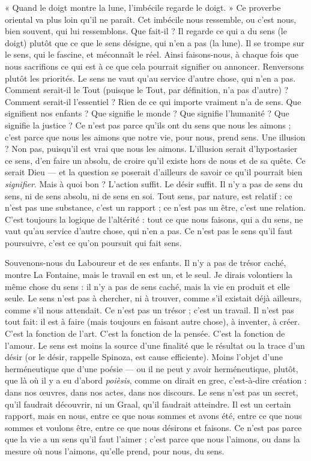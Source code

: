 « Quand le doigt montre la lune, l’imbécile regarde le doigt. » Ce proverbe
oriental va plus loin qu’il ne paraît. Cet imbécile nous ressemble, ou c’est nous,
bien souvent, qui lui ressemblons. Que fait-il ? Il regarde ce qui a du sens (le
doigt) plutôt que ce que le sens désigne, qui n’en a pas (la lune). Il se trompe
sur le sens, qui le fascine, et méconnaît le réel. Ainsi faisons-nous, à chaque fois
que nous sacrifions ce qui est à ce que cela pourrait signifier ou annoncer. Renversons
plutôt les priorités. Le sens ne vaut qu’au service d’autre chose, qui n’en
a pas. Comment serait-il le Tout (puisque le Tout, par définition, n’a pas
d’autre) ? Comment serait-il l’essentiel ? Rien de ce qui importe vraiment n’a
de sens. Que signifient nos enfants ? Que signifie le monde ? Que signifie
l'humanité ? Que signifie la justice ? Ce n’est pas parce qu’ils ont du sens que
nous les aimons ; c’est parce que nous les aimons que notre vie, pour nous,
prend sens. Une illusion ? Non pas, puisqu'il est vrai que nous les aimons.
L’illusion serait d’hypostasier ce sens, d’en faire un absolu, de croire qu’il existe
hors de nous et de sa quête. Ce serait Dieu — et la question se poserait d’ailleurs
de savoir ce qu’il pourrait bien {\it signifier}. Mais à quoi bon ? L'action suffit. Le
désir suffit. Il n’y a pas de sens du sens, ni de sens absolu, ni de sens en soi.
Tout sens, par nature, est relatif : ce n’est pas une substance, c’est un rapport ;
ce n'est pas un être, c’est une relation. C’est toujours la logique de l’altérité :
tout ce que nous faisons, qui a du sens, ne vaut qu’au service d’autre chose, qui
n'en a pas. Ce n’est pas le sens qu’il faut poursuivre, c’est ce qu’on poursuit qui
fait sens.

Souvenons-nous du Laboureur et de ses enfants. Il n’y a pas de trésor
caché, montre La Fontaine, mais le travail en est un, et le seul. Je dirais volontiers
la même chose du sens : il n’y a pas de sens caché, mais la vie en produit
et elle seule. Le sens n’est pas à chercher, ni à trouver, comme s’il existait déjà
ailleurs, comme s’il nous attendait. Ce n’est pas un trésor ; c’est un travail. Il
n'est pas tout fait: il est à faire (mais toujours en faisant autre chose), à
inventer, à créer. C’est la fonction de l’art. C’est la fonction de la pensée. C’est
la fonction de l'amour. Le sens est moins la source d’une finalité que le résultat
ou la trace d’un désir (or le désir, rappelle Spinoza, est cause efficiente). Moins
l’objet d’une herméneutique que d’une poésie — ou il ne peut y avoir herméneutique,
plutôt, que là où il y a eu d’abord {\it poièsis}, comme on dirait en grec,
c'est-à-dire création : dans nos œuvres, dans nos actes, dans nos discours. Le
sens n'est pas un secret, qu'il faudrait découvrir, ni un Graal, qu’il faudrait
atteindre. Il est un certain rapport, mais en nous, entre ce que nous sommes et
avons été, entre ce que nous sommes et voulons être, entre ce que nous désirons
et faisons. Ce n’est pas parce que la vie a un sens qu’il faut l’aimer ; c’est parce
que nous l’aimons, ou dans la mesure où nous l’aimons, qu’elle prend, pour
nous, du sens.

